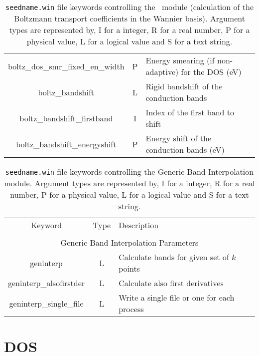 \begin{table}[hH!]
\begin{center}
\begin{tabular}{|c|c|p{6cm}|}
{\sc boltz\_dos\_smr\_fixed\_en\_width} & P  & Energy smearing (if non-adaptive) for the DOS (eV) \\
{\sc boltz\_bandshift} & L & Rigid bandshift of the conduction bands\\
{\sc boltz\_bandshift\_firstband} & I & Index of the first band to shift\\
{\sc boltz\_bandshift\_energyshift} & P & Energy shift of the conduction bands (eV)\\
\hline
\end{tabular}
\caption[Parameter file keywords controlling the \bw\ module.]
{{\tt seedname.win} file keywords controlling the \bw\ module (calculation of the Boltzmann transport coefficients in the Wannier basis). Argument types
are represented by, I for a integer, R for a real number, P for a
physical value, L for a logical value and S for a text string.}
\label{parameter_keywords_bw}
\end{center}
\end{table}

\begin{table}[hH!]
\begin{center}
\begin{tabular}{|c|c|p{6cm}|}
\hline
Keyword & Type & Description \\
        &      &             \\
\hline\hline
\multicolumn{3}{|c|}{Generic Band Interpolation Parameters} \\
\hline
{\sc geninterp}   & L & Calculate bands for given set of $k$ points \\
{\sc geninterp\_alsofirstder} & L & Calculate also first derivatives\\ 
{\sc geninterp\_single\_file} & L & Write a single file or one for each
process\\ 
\hline
\end{tabular}
\caption[Parameter file keywords controlling the Generic Band Interpolation module.]
{{\tt seedname.win} file keywords controlling the Generic Band Interpolation module. Argument types
are represented by, I for a integer, R for a real number, P for a
physical value, L for a logical value and S for a text string.}
\label{parameter_keywords_geninterp}
\end{center}
\end{table}

\clearpage
\section{DOS}
